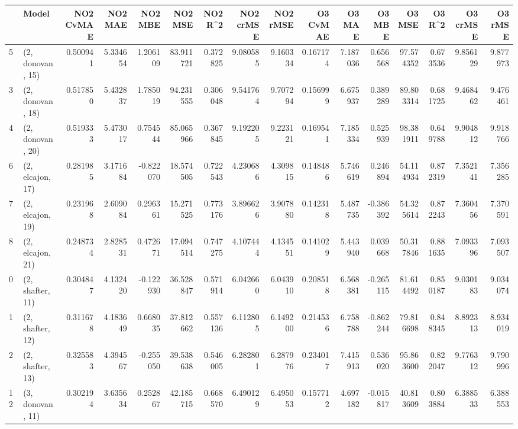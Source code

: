 \begin{tabular}{llrrrrrrrrrrrrrr}
\toprule
{} &             Model &  NO2 CvMAE &   NO2 MAE &   NO2 MBE &    NO2 MSE &   NO2 R\textasciicircum2 &  NO2 crMSE &  NO2 rMSE &  O3 CvMAE &    O3 MAE &    O3 MBE &      O3 MSE &    O3 R\textasciicircum2 &   O3 crMSE &    O3 rMSE \\
\midrule
5  &  (2, donovan, 15) &   0.500941 &  5.334654 &  1.206109 &  83.911721 &  0.372825 &   9.080585 &  9.160334 &  0.167174 &  7.187036 &  0.656568 &   97.574352 &  0.673536 &   9.856129 &   9.877973 \\
3  &  (2, donovan, 18) &   0.517850 &  5.432837 &  1.785019 &  94.231555 &  0.306048 &   9.541764 &  9.707294 &  0.156999 &  6.675937 &  0.389289 &   89.803314 &  0.681725 &   9.468462 &   9.476461 \\
4  &  (2, donovan, 20) &   0.519333 &  5.473017 &  0.754544 &  85.065966 &  0.367845 &   9.192205 &  9.223121 &  0.169541 &  7.185334 &  0.525939 &   98.381911 &  0.649788 &   9.904812 &   9.918766 \\
6  &  (2, elcajon, 17) &   0.281985 &  3.171684 & -0.822070 &  18.574505 &  0.722543 &   4.230686 &  4.309815 &  0.148486 &  5.746619 &  0.246894 &   54.114934 &  0.872319 &   7.352141 &   7.356285 \\
7  &  (2, elcajon, 19) &   0.231968 &  2.609084 &  0.296361 &  15.271525 &  0.773176 &   3.896626 &  3.907880 &  0.142318 &  5.487735 & -0.386392 &   54.325614 &  0.872243 &   7.360456 &   7.370591 \\
8  &  (2, elcajon, 21) &   0.248734 &  2.828531 &  0.472671 &  17.094514 &  0.747275 &   4.107444 &  4.134551 &  0.141029 &  5.443940 &  0.039668 &   50.317846 &  0.881635 &   7.093396 &   7.093507 \\
0  &  (2, shafter, 11) &   0.304847 &  4.132420 & -0.122930 &  36.528847 &  0.571914 &   6.042660 &  6.043910 &  0.208518 &  6.568381 & -0.265115 &   81.614492 &  0.850187 &   9.030183 &   9.034074 \\
1  &  (2, shafter, 12) &   0.311678 &  4.183649 &  0.668035 &  37.812662 &  0.557136 &   6.112805 &  6.149200 &  0.214536 &  6.758788 & -0.862244 &   79.816698 &  0.848345 &   8.892313 &   8.934019 \\
2  &  (2, shafter, 13) &   0.325583 &  4.394567 & -0.255050 &  39.538638 &  0.546005 &   6.282801 &  6.287976 &  0.234017 &  7.415913 &  0.536020 &   95.863600 &  0.822047 &   9.776312 &   9.790996 \\
12 &  (3, donovan, 11) &   0.302194 &  3.635634 &  0.252867 &  42.185715 &  0.668570 &   6.490129 &  6.495053 &  0.157712 &  4.697182 & -0.015817 &   40.813609 &  0.803884 &   6.388533 &   6.388553 \\

\end{tabular}
